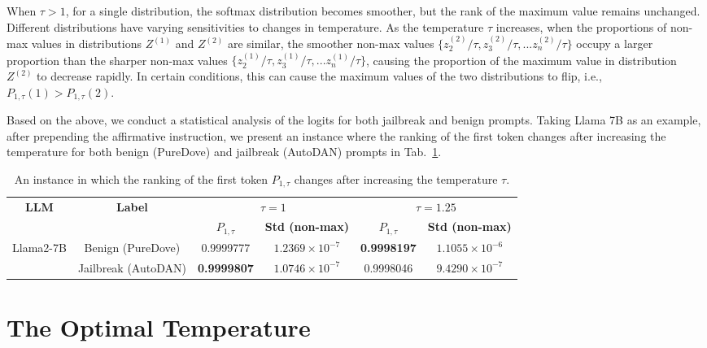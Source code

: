 \documentclass{article}
\begin{document}
When $\tau>1$, for a single distribution, the softmax distribution becomes smoother, but the rank of the maximum value remains unchanged. Different distributions have varying sensitivities to changes in temperature. As the temperature $\tau$ increases, when the proportions of non-max values in distributions $Z^{(1)}$ and $Z^{(2)}$ are similar, the smoother non-max values $\{z^{(2)}_2/\tau, z^{(2)}_3/\tau, ...z^{(2)}_n/\tau\}$ occupy a larger proportion than the sharper non-max values $\{z^{(1)}_2/\tau, z^{(1)}_3/\tau, ...z^{(1)}_n/\tau\}$, causing the proportion of the maximum value in distribution $Z^{(2)}$ to decrease rapidly. In certain conditions, this can cause the maximum values of the two distributions to flip, i.e., $P_{1,\tau}(1) > P_{1,\tau}(2)$.

Based on the above, we conduct a statistical analysis of the logits for both jailbreak and benign prompts. Taking Llama 7B as an example, after prepending the affirmative instruction, we present an instance where the ranking of the first token changes after increasing the temperature for both benign (PureDove) and jailbreak (AutoDAN) prompts in Tab.~\ref{temp_example}.

\begin{table}[!h]
    \centering
    \caption{An instance in which the ranking of the first token $P_{1,\tau}$ changes after increasing the temperature $\tau$.}
    \footnotesize
    \setlength\tabcolsep{11pt}
    \begin{tabular}{cccccc}
    \toprule
         \multirow{2}{*}{\textbf{LLM}} & \multirow{2}{*}{\textbf{Label}} & \multicolumn{2}{c}{\textbf{$\tau=1$}} & \multicolumn{2}{c}{\textbf{$\tau=1.25$}} \\
         \cmidrule{3-4}
         \cmidrule{5-6}
          & & $P_{1,\tau}$ & \textbf{Std (non-max)} & \textbf{$P_{1,\tau}$} & \textbf{Std (non-max)}\\
         \midrule
         \multirow{2}{*}{Llama2-7B} 
         & Benign (PureDove) & 0.9999777 & $1.2369\times10^{-7}$ & \textbf{0.9998197} & $1.1055\times10^{-6}$ \\
         & Jailbreak (AutoDAN) & \textbf{0.9999807} & $1.0746\times10^{-7}$ & 0.9998046 & $9.4290\times10^{-7}$ \\
    \bottomrule
    \end{tabular}
    
    \label{temp_example}
\end{table}


\section{The Optimal Temperature}\label{app:temp}
\end{document}
